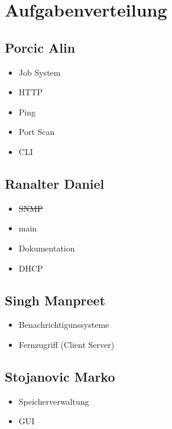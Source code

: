 \documentclass[10pt,a4paper]{report}
\begin{document}
\section{Aufgabenverteilung}
\subsection{Porcic Alin}
\begin{itemize}
\item Job System
\item HTTP
\item Ping
\item Port Scan
\item CLI
\end{itemize}
\subsection{Ranalter Daniel}
\begin{itemize}
\item \sout{SNMP}
\item main
\item Dokumentation
\item DHCP
\end{itemize}
\subsection{Singh Manpreet}
\begin{itemize}
\item Benachrichtigunssysteme
\item Fernzugriff (Client Server)
\end{itemize}
\subsection{Stojanovic Marko}
\begin{itemize}
\item Speicherverwaltung 
\item GUI
\end{itemize}
\end{document}
